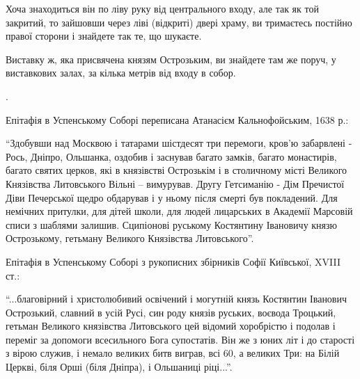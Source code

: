 Хоча знаходиться він по ліву руку від центрального входу, але так як той
закритий, то зайшовши через ліві (відкриті) двері храму, ви тримаєтесь постійно
правої сторони і знайдете так те, що шукаєте. 

Виставку ж, яка присвячена князям Острозьким, ви знайдете там же поруч, у
виставкових залах, за кілька метрів від входу в собор.

.

Епітафія в Успенському Соборі переписана Атанасієм Кальнофойським, 1638 р.:

\enquote{Здобувши над Москвою і татарами шістдесят три перемоги, кров'ю забарвлені -
Рось, Дніпро, Ольшанка, оздобив і заснував багато замків, багато монастирів,
багато святих церков, які в князівстві Острозькім і в столичному місті
Великого Князівства Литовського Вільні – вимурував. Другу Гетсиманію - Дім
Пречистої Діви Печерської щедро обдарував і у ньому після смерті був
покладений. Для немічних притулки, для дітей школи, для людей лицарських в
Академії Марсовій списи з шаблями залишив. Сципіонові руському Костянтину
Івановичу князю Острозькому, гетьману Великого Князівства Литовського}.

Епітафія в Успенському Соборі з рукописних збірників Софії Київської, XVIII
ст.:

\enquote{...благовірний і христолюбивий освічений і могутній князь Костянтин Іванович
Острозький, славний в усій Русі, син роду князів руських, воєвода Троцький,
гетьман Великого князівства Литовського цей відомий хоробрістю і подолав і
переміг за допомоги всесильного Бога супостатів. Він же з юних літ і до
старості з вірою служив, і немало великих битв виграв, всі 60, а великих Три:
на Білій Церкві, біля Орші (біля Дніпра), і Ольшаниці ріці...}.

